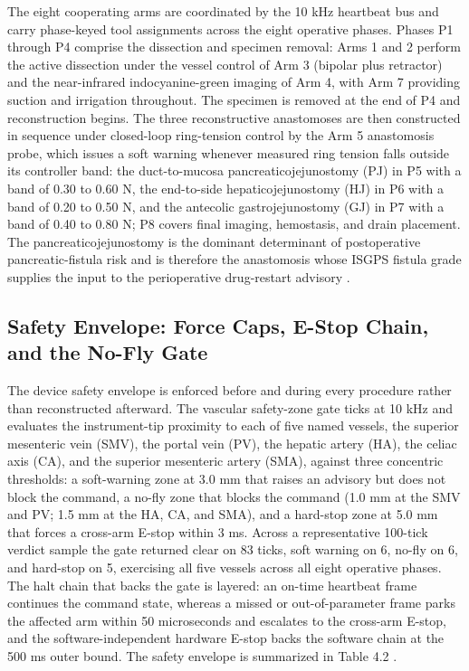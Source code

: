 The eight cooperating arms are coordinated by the 10 kHz heartbeat bus and carry
phase-keyed tool assignments across the eight operative phases. Phases P1 through
P4 comprise the dissection and specimen removal: Arms 1 and 2 perform the active
dissection under the vessel control of Arm 3 (bipolar plus retractor) and the
near-infrared indocyanine-green imaging of Arm 4, with Arm 7 providing suction and
irrigation throughout. The specimen is removed at the end of P4 and reconstruction
begins. The three reconstructive anastomoses are then constructed in sequence under
closed-loop ring-tension control by the Arm 5 anastomosis probe, which issues a
soft warning whenever measured ring tension falls outside its controller band: the
duct-to-mucosa pancreaticojejunostomy (PJ) in P5 with a band of 0.30 to 0.60 N, the
end-to-side hepaticojejunostomy (HJ) in P6 with a band of 0.20 to 0.50 N, and the
antecolic gastrojejunostomy (GJ) in P7 with a band of 0.40 to 0.80 N; P8 covers
final imaging, hemostasis, and drain placement. The pancreaticojejunostomy is the
dominant determinant of postoperative pancreatic-fistula risk and is therefore the
anastomosis whose ISGPS fistula grade supplies the input to the perioperative
drug-restart advisory \cite{daraxwhipple,paisitedocpk}.

\subsection*{Safety Envelope: Force Caps, E-Stop Chain, and the No-Fly Gate}

The device safety envelope is enforced before and during every procedure rather
than reconstructed afterward. The vascular safety-zone gate ticks at 10 kHz and
evaluates the instrument-tip proximity to each of five named vessels, the superior
mesenteric vein (SMV), the portal vein (PV), the hepatic artery (HA), the celiac
axis (CA), and the superior mesenteric artery (SMA), against three concentric
thresholds: a soft-warning zone at 3.0 mm that raises an advisory but does not block
the command, a no-fly zone that blocks the command (1.0 mm at the SMV and PV; 1.5 mm
at the HA, CA, and SMA), and a hard-stop zone at 5.0 mm that forces a cross-arm
E-stop within 3 ms. Across a representative 100-tick verdict sample the gate
returned clear on 83 ticks, soft warning on 6, no-fly on 6, and hard-stop on 5,
exercising all five vessels across all eight operative phases. The halt chain that
backs the gate is layered: an on-time heartbeat frame continues the command state,
whereas a missed or out-of-parameter frame parks the affected arm within 50
microseconds and escalates to the cross-arm E-stop, and the software-independent
hardware E-stop backs the software chain at the 500 ms outer bound. The safety
envelope is summarized in Table 4.2 \cite{daraxwhipple,clintrustpai}.

